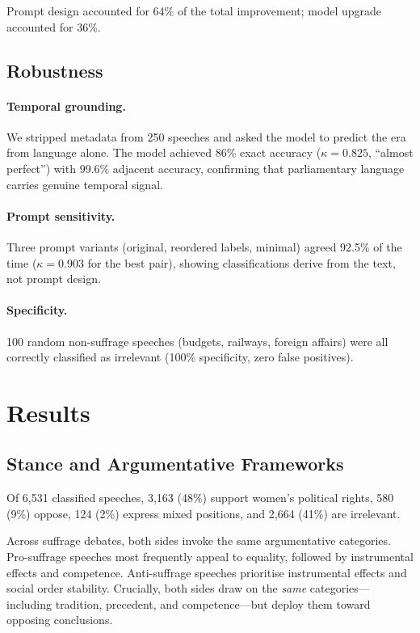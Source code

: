 \documentclass[11pt]{article}
\begin{document}
Prompt design accounted for 64\% of the total improvement; model upgrade accounted for 36\%.

\subsection{Robustness}

\paragraph{Temporal grounding.}
We stripped metadata from 250 speeches and asked the model to predict the era from language alone.
The model achieved 86\% exact accuracy ($\kappa = 0.825$, ``almost perfect'') with 99.6\% adjacent accuracy, confirming that parliamentary language carries genuine temporal signal.

\paragraph{Prompt sensitivity.}
Three prompt variants (original, reordered labels, minimal) agreed 92.5\% of the time ($\kappa = 0.903$ for the best pair), showing classifications derive from the text, not prompt design.

\paragraph{Specificity.}
100 random non-suffrage speeches (budgets, railways, foreign affairs) were all correctly classified as irrelevant (100\% specificity, zero false positives).

\section{Results}

\subsection{Stance and Argumentative Frameworks}


Of 6,531 classified speeches, 3,163 (48\%) support women's political rights, 580 (9\%) oppose, 124 (2\%) express mixed positions, and 2,664 (41\%) are irrelevant.

Across suffrage debates, both sides invoke the same argumentative categories.
Pro-suffrage speeches most frequently appeal to equality, followed by instrumental effects and competence.
Anti-suffrage speeches prioritise instrumental effects and social order stability.
Crucially, both sides draw on the \emph{same} categories---including tradition, precedent, and competence---but deploy them toward opposing conclusions.
\end{document}
